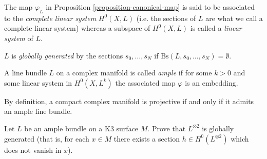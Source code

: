 \begin{definition}
\label{definition-linear-system}
\begin{reference}
\cite[p. 86]{huc}
\end{reference}
The map $\varphi_L$ in Proposition \ref{proposition-canonical-map} is said to be
associated to the {\it complete linear system} $H^{0}(X,L)$ (i.e. the sections
of $L$ are what we call a complete linear system) whereas a subspace of 
$H^{0}(X,L)$ is called a {\it linear system} of $L$.
\end{definition}

\begin{definition}
\label{definition-globally-generated}
\begin{reference}
\cite[p. 86]{huc}
\end{reference}
$L$ is {\it globally generated} by the sections $s_0,\ldots,s_N$ if
$\text{Bs}(L,s_0,\ldots,s_N)=\emptyset$.
\end{definition}

\begin{definition}
\label{definition-ample}
\begin{reference}
\cite[Definition 2.3.28]{huc}
\end{reference}
A line bundle $L$ on a complex manifold is called {\it ample} if for some $k>0$
and some linear system in $H^{0}(X,L^k)$ the associated map $\varphi$ is an
embedding.
\end{definition}

\begin{slogan}
By definition, a compact complex manifold is projective if and only if it admits
an ample line bundle.
\end{slogan}

\begin{exercise}
\label{exercise-L-ample-implies-Lotimes2-globally-generated}
Let $L$ be an ample bundle on a K3 surface $M$. Prove that $L^{\otimes 2}$ is
globally generated (that is, for each $x \in M$ there exists a section $h \in
H^{0}(L^{\otimes 2})$ which does not vanish in $x$).
\end{exercise}

